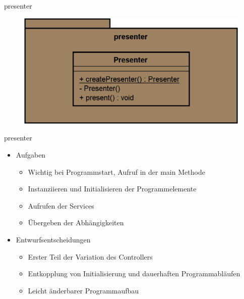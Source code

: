 \begin{frame}{presenter}
  \begin{figure}
    \centering
    \includegraphics[width=\textwidth]{./images/presenter.png}
  \end{figure}
\end{frame}

\begin{frame}{presenter}
  \begin{itemize}[<+->]
    \item Aufgaben
      \begin{itemize}
        \item Wichtig bei Programmstart, Aufruf in der main Methode
        \item Instanziieren und Initialisieren der Programmelemente
        \item Aufrufen der Services
        \item Übergeben der Abhängigkeiten
      \end{itemize}
      \item Entwurfsentscheidungen
        \begin{itemize}
          \item Erster Teil der Variation des Controllers
          \item Entkopplung von Initialisierung und dauerhaften Programmabläufen
          \item Leicht änderbarer Programmaufbau
        \end{itemize}
  \end{itemize}
\end{frame}